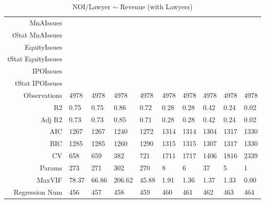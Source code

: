 \begin{table}[ht]
\begin{tabular}{rlllllllll}
  MnAIssues &  &  &  &  &  &  &  &  &  \\ 
  tStat MnAIssues &  &  &  &  &  &  &  &  &  \\ 
  EquityIssues &  &  &  &  &  &  &  &  &  \\ 
  tStat EquityIssues &  &  &  &  &  &  &  &  &  \\ 
  IPOIssues &  &  &  &  &  &  &  &  &  \\ 
  tStat IPOIssues &  &  &  &  &  &  &  &  &  \\ 
  Observations & 4978 & 4978 & 4978 & 4978 & 4978 & 4978 & 4978 & 4978 & 4978 \\ 
  R2 & 0.75 & 0.75 & 0.86 & 0.72 & 0.28 & 0.28 & 0.42 & 0.24 & 0.02 \\ 
  Adj R2 & 0.73 & 0.73 & 0.85 & 0.71 & 0.28 & 0.28 & 0.42 & 0.24 & 0.02 \\ 
  AIC & 1267 & 1267 & 1240 & 1272 & 1314 & 1314 & 1304 & 1317 & 1330 \\ 
  BIC & 1285 & 1285 & 1260 & 1290 & 1315 & 1315 & 1307 & 1317 & 1330 \\ 
  CV & 658 & 659 & 382 & 721 & 1711 & 1717 & 1406 & 1816 & 2339 \\ 
  Params & 273 & 271 & 302 & 270 & 8 & 6 & 37 & 5 & 1 \\ 
  MaxVIF & 78.37 & 66.86 & 206.62 & 45.88 & 1.91 & 1.36 & 1.37 & 1.33 & 0.00 \\ 
  Regression Num & 456 & 457 & 458 & 459 & 460 & 461 & 462 & 463 & 464 \\ 
   \hline
\end{tabular}
\caption{NOI/Lawyer $\sim$ Revenue (with Lawyers)} 
\end{table}
